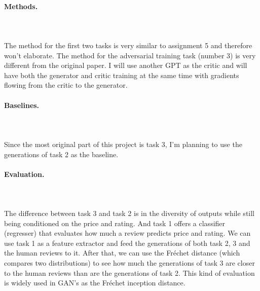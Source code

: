 \documentclass{article}
\begin{document}
\paragraph{Methods.}$ $
\\\\ The method for the first two tasks is very similar to assignment 5 and therefore won't elaborate. The method for the adversarial training task (number 3) is very different from the original paper. I will use another GPT as the critic and will have both the generator and critic training at the same time with gradients flowing from the critic to the generator.
\paragraph{Baselines.}$ $
\\\\Since the most original part of this project is task 3, I'm planning to use the generations of task 2 as the baseline.
\paragraph{Evaluation.}$ $
\\\\The difference between task 3 and task 2 is in the diversity of outputs while still being conditioned on the price and rating. And task 1 offers a classifier (regresser) that evaluates how much a review predicts price and rating. We can use task 1 as a feature extractor and feed the generations of both task 2, 3 and the human reviews to it. After that, we can use the Fréchet distance (which compares two distributions) to see how much the generations of task 3 are closer to the human reviews than are the generations of task 2. This kind of evaluation is widely used in GAN's as the Fréchet inception distance.



\end{document}
